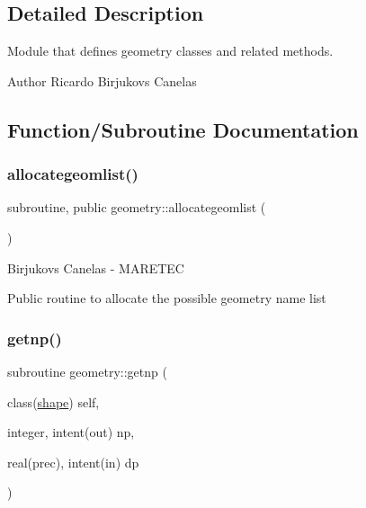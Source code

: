 \subsection{Detailed Description}
Module that defines geometry classes and related methods. 

\begin{DoxyAuthor}{Author}
Ricardo Birjukovs Canelas 
\end{DoxyAuthor}


\subsection{Function/\+Subroutine Documentation}
\mbox{\label{namespacegeometry_a17652db20fde3f883b4fc778e0e6cdda}} 
\subsubsection{\texorpdfstring{allocategeomlist()}{allocategeomlist()}}
{\footnotesize\ttfamily subroutine, public geometry\+::allocategeomlist (\begin{DoxyParamCaption}{ }\end{DoxyParamCaption})}



Birjukovs Canelas -\/ M\+A\+R\+E\+T\+EC 

Public routine to allocate the possible geometry name list \mbox{\label{namespacegeometry_ad14d7800ac13b9a6722ac96b06ce94c9}} 
\subsubsection{\texorpdfstring{getnp()}{getnp()}}
{\footnotesize\ttfamily subroutine geometry\+::getnp (\begin{DoxyParamCaption}\item[{class(\mbox{\hyperlink{structgeometry_1_1shape}{shape}})}]{self,  }\item[{integer, intent(out)}]{np,  }\item[{real(prec), intent(in)}]{dp }\end{DoxyParamCaption})\hspace{0.3cm}{\ttfamily [private]}}



